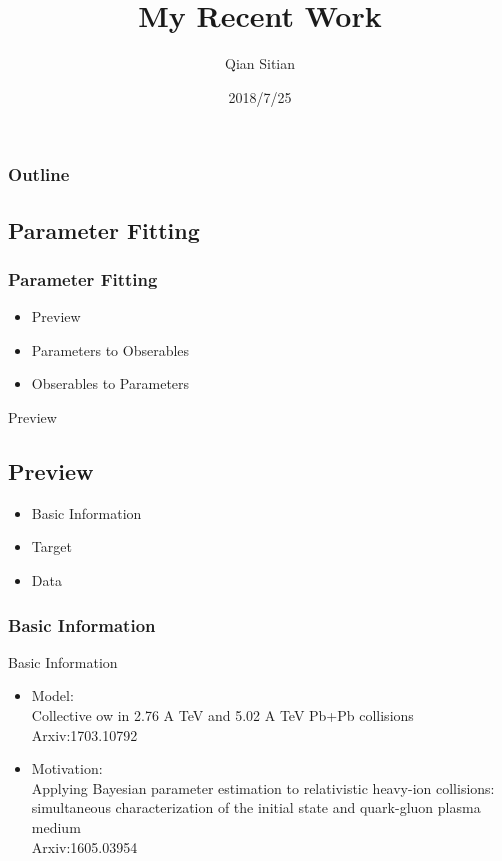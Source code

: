 \documentclass{beamer}
\title{My Recent Work}
\author{Qian Sitian}
\date{2018/7/25}
\begin{document}
\begin{frame}
    \titlepage
\end{frame}
\begin{frame}
    \frametitle{Outline}
    \tableofcontents[hideallsubsections]
\end{frame}
\begin{frame}   
    \section{Parameter Fitting}
    \frametitle{Parameter Fitting}
    \begin{itemize}
        \item Preview
        \item Parameters to Obserables
        \item Obserables to Parameters
    \end{itemize}
\end{frame}
\begin{frame}{Preview}
    \subsection{Preview}
    \begin{itemize}
        \item Basic Information
        \item Target
        \item Data
    \end{itemize}
\end{frame}
\begin{frame}
    \frametitle{Basic Information}
    
    Basic Information
    \begin{itemize}
        \item Model:\\Collective 
        ow in 2.76 A TeV and 5.02 A TeV Pb+Pb
        collisions
        \\
        Arxiv:1703.10792
        \item Motivation:\\Applying Bayesian parameter estimation to relativistic heavy-ion collisions:
        simultaneous characterization of the initial state and quark-gluon plasma medium
        \\
        Arxiv:1605.03954
    \end{itemize}
\end{frame}
\end{document}

